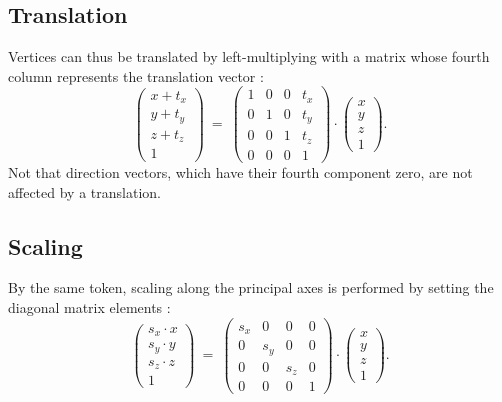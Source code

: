 \subsection{Translation}
Vertices can thus be translated by left-multiplying with a matrix whose fourth column represents the translation
vector \cite{web_gl_translate}:
\begin{equation}
	\left( \begin{array}{c} x + t_x \\ y + t_y \\ z + t_z \\ 1 \end{array} \right) 
	\ =\  
	\left( \begin{array}{cccc} 
		1 & 0 & 0 & t_x \\
		0 & 1 & 0 & t_y \\
		0 & 0 & 1 & t_z \\
		0 & 0 & 0 & 1
	\end{array} \right) \cdot
	\left( \begin{array}{c} x \\ y \\ z \\ 1 \end{array} \right).
\end{equation}
Not that direction vectors, which have their fourth component zero, are not affected by a translation.


\subsection{Scaling}
By the same token, scaling along the principal axes is performed by setting the diagonal matrix 
elements \cite{web_gl_scale}:
\begin{equation}
	\left( \begin{array}{c} s_x \cdot x \\ s_y \cdot y \\ s_z \cdot z \\ 1 \end{array} \right) 
	\ =\  
	\left( \begin{array}{cccc} 
		s_x & 0 & 0 & 0 \\
		0 & s_y & 0 & 0 \\
		0 & 0 & s_z & 0 \\
		0 & 0 & 0 & 1
	\end{array} \right) \cdot
	\left( \begin{array}{c} x \\ y \\ z \\ 1 \end{array} \right).
\end{equation}


